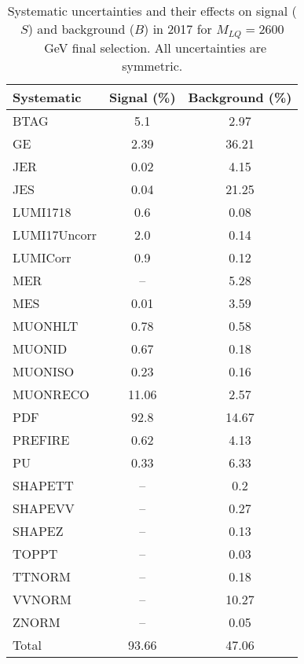 \begin{table}[htbp]
\begin{center}
\caption{Systematic uncertainties and their effects on signal ($S$) and background ($B$) in 2017 for $M_{LQ}=2600$~GeV final selection. All uncertainties are symmetric.}
\begin{tabular}{lcc}
\hline\hline
Systematic & Signal (\%) & Background (\%) \\ \hline 
BTAG & 5.1 & 2.97\\ 
GE & 2.39 & 36.21\\ 
JER & 0.02 & 4.15\\ 
JES & 0.04 & 21.25\\ 
LUMI1718 & 0.6 & 0.08\\ 
LUMI17Uncorr & 2.0 & 0.14\\ 
LUMICorr & 0.9 & 0.12\\ 
MER & -- & 5.28\\ 
MES & 0.01 & 3.59\\ 
MUONHLT & 0.78 & 0.58\\ 
MUONID & 0.67 & 0.18\\ 
MUONISO & 0.23 & 0.16\\ 
MUONRECO & 11.06 & 2.57\\ 
PDF & 92.8 & 14.67\\ 
PREFIRE & 0.62 & 4.13\\ 
PU & 0.33 & 6.33\\ 
SHAPETT & -- & 0.2\\ 
SHAPEVV & -- & 0.27\\ 
SHAPEZ & -- & 0.13\\ 
TOPPT & -- & 0.03\\ 
TTNORM & -- & 0.18\\ 
VVNORM & -- & 10.27\\ 
ZNORM & -- & 0.05\\ 
Total & 93.66 & 47.06\\ \hline \hline
\end{tabular}
\label{tab:SysUncertainties_uujj_2600}
\end{center}
\end{table}

